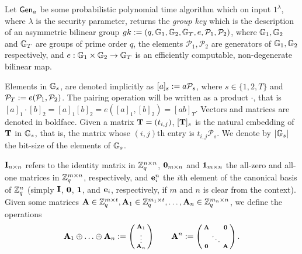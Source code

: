 Let $\mathsf{Gen}_a$ be some probabilistic polynomial time algorithm which on input $1^{\lambda}$, where $\lambda$ is the security parameter, returns the \emph{group key} which is the description of an asymmetric bilinear group $gk:=(q,\mathbb{G}_1,\mathbb{G}_2,\mathbb{G}_T,e,\mathcal{P}_1,\mathcal{P}_2)$, where $\mathbb{G}_1,\mathbb{G}_2$
and $\mathbb{G}_T$ are groups of prime order $q$, the elements $\mathcal{P}_1, \mathcal{P}_2$ are generators of 
$\mathbb{G}_1,\mathbb{G}_2$ respectively, and $e:\mathbb{G}_1\times\mathbb{G}_2\to\mathbb{G}_T$ is an efficiently
computable, non-degenerate bilinear map. 

Elements in $\mathbb{G}_s$, are denoted implicitly as $[a]_s:=a \mathcal{P}_s$, where $s \in \{1,2,T\}$ and $\mathcal{P}_T:=e(\mathcal{P}_1,\mathcal{P}_2)$. 
The pairing operation will be written as a product $\cdot$, that is $[a]_1 \cdot [b]_2=[a]_1 [b]_2=e([a]_1,[b]_2)=[ab]_T$. Vectors and matrices are denoted in boldface. Given a matrix $\mathbf{{T}}=(t_{i,j})$, $[\mathbf{{T}}]_s$ is
the natural embedding of $\mathbf{{T}}$ in $\mathbb{G}_s$, that is, the matrix whose $(i,j)$th entry
is $t_{i,j}\mathcal{P}_s$. We denote by $|\mathbb{G}_s|$ the bit-size of the elements of $\mathbb{G}_s$.

$\mathbf{{I}}_{n\times n}$ refers to the identity matrix in $\mathbb{Z}_q^{n\times n}$, $\mathbf{{0}}_{m\times n}$ and $\mathbf{{1}}_{m\times n}$ the all-zero and all-one matrices in $\mathbb{Z}_q^{m\times n}$, respectively, and $\mathbf{e}^{n}_i$ the $i$th element 
of the canonical basis of $\mathbb{Z}_q^{n}$ (simply $\mathbf{{I}}$, $\mathbf{{0}}$, $\mathbf{{1}}$, and $\mathbf{e}_i$, respectively, if $m$ and $n$ is clear from the context). 
Given some matrices $\mathbf{{A}}\in\mathbb{Z}_q^{m\times t},\mathbf{{A}}_1\in\mathbb{Z}_q^{m_1\times t},\ldots,\mathbf{{A}}_n\in\mathbb{Z}_q^{m_n\times n}$, we define the operations $$\mathbf{A}_1 \oplus \ldots \oplus \mathbf{A}_n:=\left(\begin{smallmatrix} \mathbf{A}_1 \\ \vdots \\  \mathbf{A}_n\end{smallmatrix}\right) \qquad 
\mathbf{{A}}^n:=\left(\begin{smallmatrix} \mathbf{{A}} &  & \mathbf{{0}} \\   & \ddots &   \\ \mathbf{{0}} &  & \mathbf{{A}}
\end{smallmatrix}\right).$$ 



